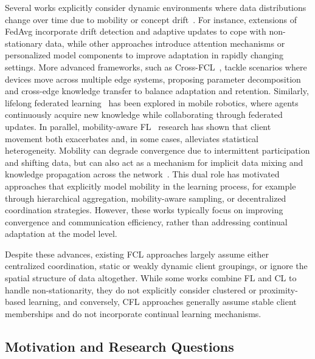 \documentclass[conference]{IEEEtran}
\theoremstyle{plain}
\theoremstyle{definition}
\begin{document}
Several works explicitly consider dynamic environments where data distributions 
 change over time due to mobility or concept drift~\cite{DBLP:journals/mta/CasadoLCIRB22,DBLP:journals/corr/abs-2111-07457}. 
%
For instance, 
 extensions of FedAvg incorporate drift detection and adaptive updates 
 to cope with non-stationary data, 
 while other approaches introduce attention mechanisms or personalized model components 
 to improve adaptation in rapidly changing settings. 
% 
More advanced frameworks, 
 such as Cross-\ac{FCL}~\cite{DBLP:journals/tmc/ZhangGSLY24}, 
 tackle scenarios where devices move across multiple edge systems, 
 proposing parameter decomposition and cross-edge knowledge transfer 
 to balance adaptation and retention. 
% 
Similarly, 
 lifelong federated learning~\cite{DBLP:conf/euspn/YuQW22} 
 has been explored in mobile robotics, 
 where agents continuously acquire new knowledge while collaborating 
 through federated updates.
%
In parallel, 
 mobility-aware \ac{FL}~\cite{DBLP:journals/corr/abs-2108-09103} 
 research has shown that client movement both exacerbates and, 
 in some cases, alleviates statistical heterogeneity. 
% 
Mobility can degrade convergence due to intermittent participation and shifting data, 
 but can also act as a mechanism for implicit data mixing 
 and knowledge propagation across the network~\cite{DBLP:journals/tvt/ChenYSZGN25}. 
% 
This dual role has motivated approaches that explicitly model mobility 
 in the learning process, 
 for example through hierarchical aggregation, mobility-aware sampling, 
 or decentralized coordination strategies. 
% 
However, 
 these works typically focus on improving convergence and communication efficiency, 
 rather than addressing continual adaptation at the model level.

Despite these advances, 
 existing \ac{FCL} approaches largely assume either centralized coordination, 
 static or weakly dynamic client groupings, 
 or ignore the spatial structure of data altogether. 
%  
While some works combine \ac{FL} and \ac{CL} to handle non-stationarity, 
 they do not explicitly consider clustered or proximity-based learning, 
 and conversely, \ac{CFL} approaches generally assume stable client memberships 
 and do not incorporate continual learning mechanisms. 

\subsection{Motivation and Research Questions}\label{sec:rqs}
\end{document}
